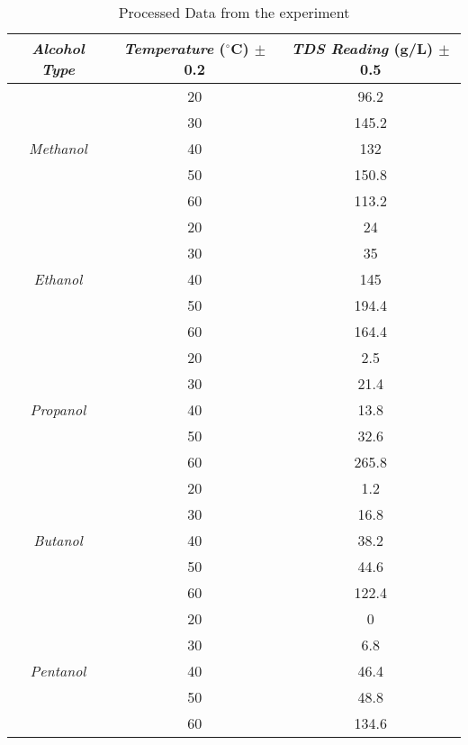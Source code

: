 





\begin{table}[H]
  \centering
  \caption{{Processed Data from \of the experiment}}
    \begin{tabular}{ccc}
    \toprule
    \textit{Alcohol Type} & \textit{Temperature} ($^\circ$C) $\pm$ 0.2 & \textit{TDS Reading} (g/L) $\pm$ 0.5 \\
    \midrule
    \multirow{5}[10]{*}{\textit{Methanol}} & 20 & 96.2 \\
\cmidrule{2-3}          & 30 & 145.2 \\
\cmidrule{2-3}          & 40 & 132 \\
\cmidrule{2-3}          & 50 & 150.8 \\
\cmidrule{2-3}          & 60 & 113.2 \\
    \midrule
    \multirow{5}[10]{*}{\textit{Ethanol}} & 20 & 24 \\
\cmidrule{2-3}          & 30 & 35 \\
\cmidrule{2-3}          & 40 & 145 \\
\cmidrule{2-3}          & 50 & 194.4 \\
\cmidrule{2-3}          & 60 & 164.4 \\
    \midrule
    \multirow{5}[10]{*}{\textit{Propanol}} & 20 & 2.5 \\
\cmidrule{2-3}          & 30 & 21.4 \\
\cmidrule{2-3}          & 40 & 13.8 \\
\cmidrule{2-3}          & 50 & 32.6 \\
\cmidrule{2-3}          & 60 & 265.8 \\
    \midrule
    \multirow{5}[10]{*}{\textit{Butanol}} & 20 & 1.2 \\
\cmidrule{2-3}          & 30 & 16.8 \\
\cmidrule{2-3}          & 40 & 38.2 \\
\cmidrule{2-3}          & 50 & 44.6 \\
\cmidrule{2-3}          & 60 & 122.4 \\
    \midrule
    \multirow{5}[10]{*}{\textit{Pentanol}} & 20 & 0 \\
\cmidrule{2-3}          & 30 & 6.8 \\
\cmidrule{2-3}          & 40 & 46.4 \\
\cmidrule{2-3}          & 50 & 48.8 \\
\cmidrule{2-3}          & 60 & 134.6 \\
    \bottomrule
    \end{tabular}%
  \label{tab:addlabel}%
\end{table}%

